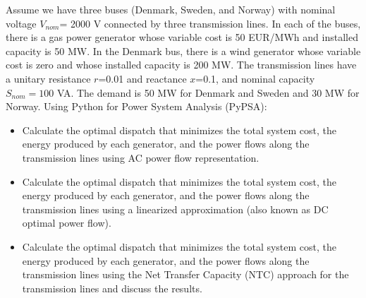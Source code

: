 \documentclass[10pt]{article}
\newenvironment{problem}[2][Problem]{\begin{trivlist}
\item[\hskip \labelsep {\bfseries #1}\hskip \labelsep {\bfseries #2.}]}{\end{trivlist}}
\begin{document}
\begin{problem}{6.4}
Assume we have three buses (Denmark, Sweden, and Norway) with nominal voltage $V_{nom}$= 2000 V connected by three transmission lines. In each of the buses, there is a gas power generator whose variable cost is 50 EUR/MWh and installed capacity is 50 MW. In the Denmark bus, there is a wind generator whose variable cost is zero and whose installed capacity is 200 MW. The transmission lines have a unitary resistance $r$=0.01 and reactance $x$=0.1, and nominal capacity $S_{nom}=100$ VA. The demand is 50 MW for Denmark and Sweden and 30 MW for Norway. Using Python for Power System Analysis (PyPSA):

\begin{itemize}
\item[a)] Calculate the optimal dispatch that minimizes the total system cost, the energy produced by each generator, and the power flows along the transmission lines using AC power flow representation.

\item[b)] Calculate the optimal dispatch that minimizes the total system cost,  the energy produced by each generator, and the power flows along the transmission lines using a linearized approximation (also known as DC optimal power flow).

\item[c)] Calculate the optimal dispatch that minimizes the total system cost,  the energy produced by each generator, and the power flows along the transmission lines using the Net Transfer Capacity (NTC) approach for the transmission lines and discuss the results.
\end{itemize}

\end{problem}

\end{document}
